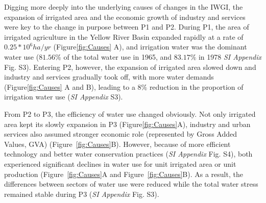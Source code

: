 Digging more deeply into the underlying causes of changes in the IWGI, the expansion of irrigated area and the economic growth of industry and services were key to the change in purpose between P1 and P2.
During P1, the area of irrigated agriculture in the Yellow River Basin expanded rapidly at a rate of $0.25*10^6 ha/yr$ (Figure\ref{fig:Causes} A), and irrigation water was the dominant water use ($81.56\%$ of the total water use in 1965, and $83.17\%$ in 1978 \textit{SI Appendix} Fig. S3).
Entering P2, however, the expansion of irrigated area slowed down and industry and services gradually took off, with more water demands (Figure\ref{fig:Causes} A and B), leading to a $8\%$ reduction in the proportion of irrigation water use (\textit{SI Appendix} S3).

From P2 to P3, the efficiency of water use changed obviously.
Not only irrigated area kept its slowly expansion in P3 (Figure\ref{fig:Causes}A), industry and urban services also assumed stronger economic role (represented by Gross Added Values, GVA) (Figure~\ref{fig:Causes}B).
However, because of more efficient technology and better water conservation practices (\textit{SI Appendix} Fig. S4), both experienced significant declines in water use for unit irrigated area or unit production (Figure~\ref{fig:Causes}A and Figure~\ref{fig:Causes}B).
As a result, the differences between sectors of water use were reduced while the total water stress remained stable during P3 (\textit{SI Appendix} Fig. S3).

